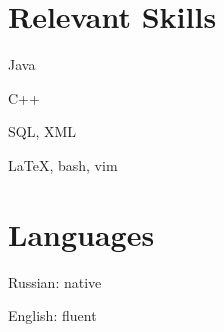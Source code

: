 \section{Relevant Skills}
\begin{innerlist}
  \item Java
  \item C++
  \item SQL, XML
  \item \LaTeX, bash, vim
\end{innerlist}

\section{Languages}
\begin{innerlist}
  \item Russian: native 
  \item English: fluent
\end{innerlist}
